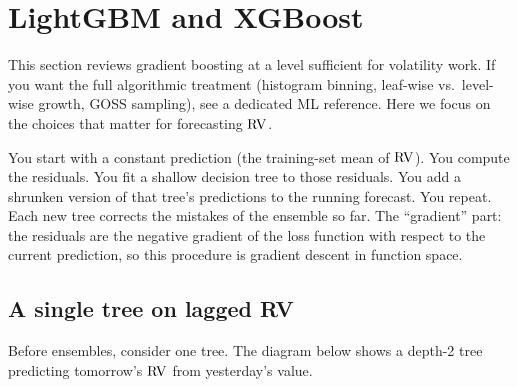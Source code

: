 \section{LightGBM and XGBoost}\label{sec:trees:gbm}

This section reviews gradient boosting at a level sufficient for volatility
work.  If you want the full algorithmic treatment (histogram binning,
leaf-wise vs.\ level-wise growth, GOSS sampling), see a dedicated ML
reference.  Here we focus on the choices that matter for forecasting $\operatorname{RV}$.

\begin{prereq}
You start with a constant prediction (the training-set mean of $\operatorname{RV}$).
You compute the residuals.  You fit a shallow decision tree to those
residuals.  You add a shrunken version of that tree's predictions to the
running forecast.  You repeat.  Each new tree corrects the mistakes of the
ensemble so far.  The ``gradient'' part: the residuals are the negative
gradient of the loss function with respect to the current prediction,
so this procedure is gradient descent in function space.
\end{prereq}

\subsection*{A single tree on lagged RV}

Before ensembles, consider one tree.  The diagram below shows a depth-2 tree
predicting tomorrow's $\operatorname{RV}$ from yesterday's value.

\begin{center}
\end{center}

